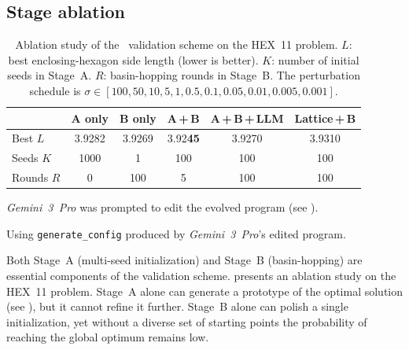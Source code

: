 \documentclass[sigconf]{acmart}
\begin{document}
\subsection{Stage ablation}
\begin{table}[t]
    \centering
    \begin{threeparttable}
        \caption{Ablation study of the \improvevolve\ validation scheme on the HEX~11 problem. $L$: best enclosing-hexagon side length (lower is better). $K$: number of initial seeds in Stage~A. $R$: basin-hopping rounds in Stage~B. The perturbation schedule is $\sigma \in [100, 50, 10, 5, 1, 0.5, 0.1, 0.05, 0.01, 0.005, 0.001]$.}
        \label{tab:stage_ablation}
        \small
        \setlength{\tabcolsep}{1.8mm}
        \begin{tabular}{lccccc}
            \toprule
             & \textbf{A only} & \textbf{B only} & \textbf{A\,+\,B} & \textbf{A\,+\,B\,+\,LLM}\tnote{1} & \textbf{Lattice\,+\,B}\tnote{2}\\
            \midrule
            Best $L$      & 3.9282 & 3.9269 & 3.92\textbf{45} & 3.9270 & 3.9310 \\
            Seeds $K$     & 1000   & 1      & 100              & 100    & 100    \\
            Rounds $R$    & 0      & 100    & 5                & 100    & 100    \\
            \bottomrule
        \end{tabular}
        \begin{tablenotes}
            \footnotesize
            \item[1] \emph{Gemini~3~Pro} was prompted to edit the evolved program (see ).
            \item[2] Using \texttt{generate\allowbreak\_config} produced by \emph{Gemini~3~Pro}'s edited program.
        \end{tablenotes}
    \end{threeparttable}
\end{table}
Both Stage~A (multi-seed initialization) and Stage~B (basin-hopping) are essential components of the validation scheme.  presents an ablation study on the HEX~11 problem. Stage~A alone can generate a prototype of the optimal solution (see ), but it cannot refine it further. Stage~B alone can polish a single initialization, yet without a diverse set of starting points the probability of reaching the global optimum remains low.
\end{document}
